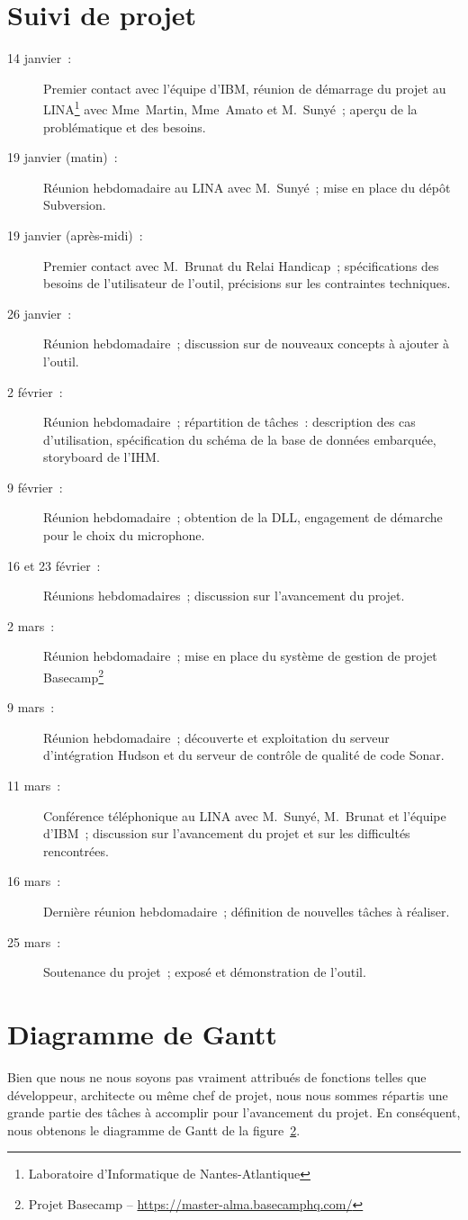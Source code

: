 \appendix

\chapter{Suivi de projet}

\begin{description}
\item[14 janvier~:] Premier contact avec l'équipe d'IBM, réunion de démarrage du projet au LINA\footnote{Laboratoire d'Informatique de Nantes-Atlantique} avec Mme~Martin, Mme~Amato et M.~Sunyé~; aperçu de la problématique et des besoins.
\item[19 janvier (matin)~:] Réunion hebdomadaire au LINA avec M.~Sunyé~; mise en place du dépôt Subversion.
\item[19 janvier (après-midi)~:] Premier contact avec M.~Brunat du Relai Handicap~; spécifications des besoins de l'utilisateur de l'outil, précisions sur les contraintes techniques.
\item[26 janvier~:] Réunion hebdomadaire~; discussion sur de nouveaux concepts à ajouter à l'outil.
\item[2 février~:] Réunion hebdomadaire~; répartition de tâches~: description des cas d'utilisation, spécification du schéma de la base de données embarquée, storyboard de l'IHM.
\item[9 février~:] Réunion hebdomadaire~; obtention de la DLL, engagement de démarche pour le choix du microphone.
\item[16 et 23 février~:] Réunions hebdomadaires~; discussion sur l'avancement du projet.
\item[2 mars~:] Réunion hebdomadaire~; mise en place du système de gestion de projet Basecamp\footnote{Projet Basecamp -- \url{https://master-alma.basecamphq.com/}}
\item[9 mars~:] Réunion hebdomadaire~; découverte et exploitation du serveur d'intégration Hudson et du serveur de contrôle de qualité de code Sonar.
\item[11 mars~:] Conférence téléphonique au LINA avec M.~Sunyé, M.~Brunat et l'équipe d'IBM~; discussion sur l'avancement du projet et sur les difficultés rencontrées.
\item[16 mars~:] Dernière réunion hebdomadaire~; définition de nouvelles tâches à réaliser.
\item[25 mars~:] Soutenance du projet~; exposé et démonstration de l'outil.
\end{description}


\chapter{Diagramme de Gantt}

Bien que nous ne nous soyons pas vraiment attribués de fonctions telles que développeur, architecte ou même chef de projet, nous nous sommes répartis une grande partie des tâches à accomplir pour l'avancement du projet.
En conséquent, nous obtenons le diagramme de Gantt de la figure~\ref{}. %


\printindex
